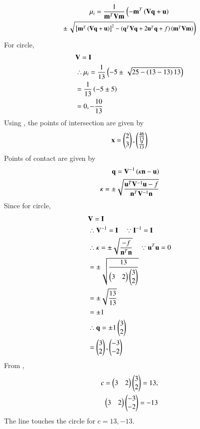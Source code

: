 \documentclass[journal,12pt,twocolumn]{IEEEtran}
\begin{document}
\begin{multline}
\mu_i = \frac{1}
{
\mathbf{m}^T\mathbf{V}\mathbf{m}
}
\left(-\mathbf{m}^T\left(\mathbf{V}\mathbf{q}+\mathbf{u}\right)\right.
\\
\pm
{\small
\ensuremath{\left.\sqrt{
{}\left[
\mathbf{m}^T\left(\mathbf{V}\mathbf{q}+\mathbf{u}\right)
\right]^2
-
\left(
\mathbf{q}^T\mathbf{V}\mathbf{q} + 2\mathbf{u}^T\mathbf{q} +f
\right)
\left(\mathbf{m}^T\mathbf{V}\mathbf{m}\right)
}
\right)}
}
\end{multline}
For circle,
\begin{align}
    &\mathbf V = \mathbf I\\ 
    & \therefore \mu_i = \frac{1}{13}\left(-5 \pm \left.\sqrt{25- \left(13-13\right)13}
    \right)
    \right.\\
    & = \frac{1}{13}\left(-5 \pm 5\right)\\
    & = 0, -\frac{10}{13}
\end{align}
Using \brak{\ref{points of intersection}}, the points of intersection are given by
\begin{align}
    \mathbf x = \begin{pmatrix}2\\3\end{pmatrix} , \begin{pmatrix}\frac{46}{13}\\ \frac{9}{13}\end{pmatrix}
\end{align}
Points of contact are given by
\begin{align}
    \mathbf q = \mathbf V^{-1} \left(\kappa \mathbf n - \mathbf u\right)\\
    \kappa = \pm \sqrt{\frac{\mathbf u^T \mathbf V^{-1} \mathbf u -f}{\mathbf n^T \mathbf V^{-1} \mathbf n}}
\end{align}
Since for circle,
\begin{align}
    &\mathbf V= \mathbf I\\
    &\therefore \mathbf V^{-1} = \mathbf I \quad \because \mathbf I^{-1}
    = \mathbf I\\
    &\therefore \kappa =\pm  \sqrt{\frac{-f}{\mathbf n^T \mathbf n}}\quad\because \mathbf u^T\mathbf u= 0\\
    & = \pm \sqrt{\frac{13}{\begin{pmatrix}3 & 2\end{pmatrix}\begin{pmatrix}3\\2\end{pmatrix}}}\\
    & = \pm \sqrt{\frac{13}{13}}\\
    & = \pm 1\\
    &\therefore \mathbf q = \pm 1\begin{pmatrix}3\\2\end{pmatrix}\\
    & = \begin{pmatrix}3\\2\end{pmatrix}, \begin{pmatrix}-3\\-2\end{pmatrix}
\end{align}
From \brak{\ref{tangent}},
\begin{align}
    c = \begin{pmatrix}3 & 2\end{pmatrix}\begin{pmatrix}3\\2\end{pmatrix} = 13, \\ \begin{pmatrix}3&2\end{pmatrix}\begin{pmatrix}-3\\-2\end{pmatrix}=-13
\end{align}
The line \brak{\ref{tangent}} touches the circle for $c = 13, -13$.
\end{document}
